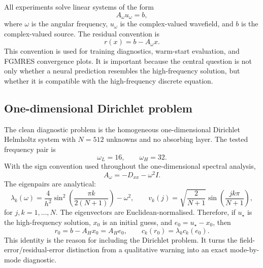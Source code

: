 All experiments solve linear systems of the form
\begin{equation}
    A_\omega u_\omega = b,
    \label{eq:setup-linear-system}
\end{equation}
where $\omega$ is the angular frequency, $u_\omega$ is the complex-valued
wavefield, and $b$ is the complex-valued source. The residual convention is
\begin{equation}
    r(x)=b-A_\omega x.
    \label{eq:setup-residual}
\end{equation}
This convention is used for training diagnostics, warm-start evaluation, and
FGMRES convergence plots. It is important because the central question is not
only whether a neural prediction resembles the high-frequency solution, but
whether it is compatible with the high-frequency discrete equation.

\subsection{One-dimensional Dirichlet problem}
\label{subsec:setup-1d-dirichlet}

The clean diagnostic problem is the homogeneous one-dimensional Dirichlet
Helmholtz system with $N=512$ unknowns and no absorbing layer. The tested
frequency pair is
\begin{equation}
    \omega_L=16,
    \qquad
    \omega_H=32.
    \label{eq:setup-1d-dirichlet-pair}
\end{equation}
With the sign convention used throughout the one-dimensional spectral
analysis,
\begin{equation}
    A_\omega=-D_{xx}-\omega^2 I.
    \label{eq:setup-1d-dirichlet-operator}
\end{equation}
The eigenpairs are analytical:
\begin{equation}
    \lambda_k(\omega)
    =
    \frac{4}{h^2}
    \sin^2\!\left(\frac{\pi k}{2(N+1)}\right)
    -
    \omega^2,
    \qquad
    v_k(j)
    =
    \sqrt{\frac{2}{N+1}}
    \sin\!\left(\frac{j k \pi}{N+1}\right),
    \label{eq:setup-dirichlet-eigenpairs}
\end{equation}
for $j,k=1,\dots,N$. The eigenvectors are Euclidean-normalised. Therefore, if
$u_\star$ is the high-frequency solution, $x_0$ is an initial guess, and
$e_0=u_\star-x_0$, then
\begin{equation}
    r_0=b-A_Hx_0=A_He_0,
    \qquad
    c_k(r_0)=\lambda_k c_k(e_0).
    \label{eq:setup-modal-residual-map}
\end{equation}
This identity is the reason for including the Dirichlet problem. It turns the
field-error/residual-error distinction from a qualitative warning into an
exact mode-by-mode diagnostic.

